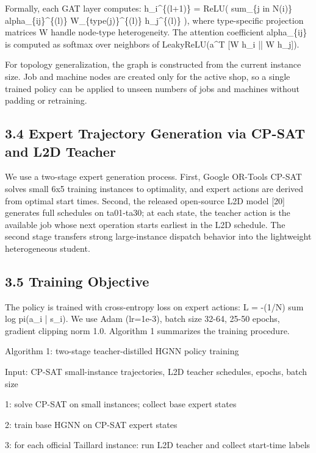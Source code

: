 \documentclass{article}
\begin{document}
Formally, each GAT layer computes: h\_i\textasciicircum{}\{(l+1)\} = ReLU( sum\_\{j in N(i)\} alpha\_\{ij\}\textasciicircum{}\{(l)\} W\_\{type(j)\}\textasciicircum{}\{(l)\} h\_j\textasciicircum{}\{(l)\} ), where type-specific projection matrices W handle node-type heterogeneity. The attention coefficient alpha\_\{ij\} is computed as softmax over neighbors of LeakyReLU(a\textasciicircum{}T {[}W h\_i || W h\_j{]}).

For topology generalization, the graph is constructed from the current instance size. Job and machine nodes are created only for the active shop, so a single trained policy can be applied to unseen numbers of jobs and machines without padding or retraining.


\subsection*{3.4 Expert Trajectory Generation via CP-SAT and L2D Teacher}

We use a two-stage expert generation process. First, Google OR-Tools CP-SAT solves small 6x5 training instances to optimality, and expert actions are derived from optimal start times. Second, the released open-source L2D model {[}20{]} generates full schedules on ta01-ta30; at each state, the teacher action is the available job whose next operation starts earliest in the L2D schedule. The second stage transfers strong large-instance dispatch behavior into the lightweight heterogeneous student.


\subsection*{3.5 Training Objective}

The policy is trained with cross-entropy loss on expert actions: L = -(1/N) sum log pi(a\_i | s\_i). We use Adam (lr=1e-3), batch size 32-64, 25-50 epochs, gradient clipping norm 1.0. Algorithm 1 summarizes the training procedure.

Algorithm 1: two-stage teacher-distilled HGNN policy training

Input: CP-SAT small-instance trajectories, L2D teacher schedules, epochs, batch size

1: solve CP-SAT on small instances; collect base expert states

2: train base HGNN on CP-SAT expert states

3: for each official Taillard instance: run L2D teacher and collect start-time labels
\end{document}
